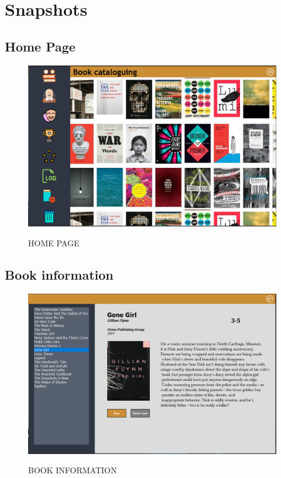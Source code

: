 \chapter{Snapshots}
\section{Home Page}
\begin{figure}[H]
\centering
\caption{HOME PAGE}
\includegraphics[scale=.5]{./sshome.png}
\\[0.2in]
\label{fig:HOME PAGE}
\end{figure}
\thispagestyle{fancy}
\section{Book information}
\begin{figure}[H]
\centering
\caption{BOOK INFORMATION}
\includegraphics[scale=.5]{./ssbook.png}
\\[0.2in]
\label{fig:BOOK INFO}
\end{figure}
\thispagestyle{fancy}
